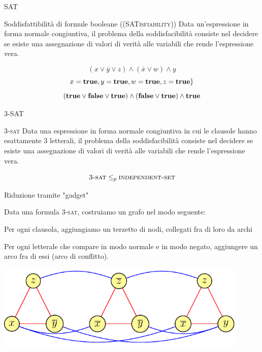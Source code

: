 \begin{frame}{SAT}

\vspace{-9pt}
\begin{block}{Soddisfattibilità di formule booleane ((\textsc{SATisfiability}))}
Data un'espressione in forma normale congiuntiva, il problema
della \alert{soddisfacibilità} consiste nel decidere se esiste una
assegnazione di valori di verità alle variabili che rende
l'espressione vera. 
\end{block}

\bigskip
{}
\[
  (x \vee \overline{y} \vee z) \wedge (\overline{x} \vee w) \wedge y
\]
\pause
\[
x = \TRUE, y = \TRUE, w = \TRUE, z = \TRUE \}
\]
\[
  (\TRUE \vee \FALSE \vee \TRUE) \wedge (\FALSE \vee \TRUE) \wedge \TRUE
\]

\end{frame}

\begin{frame}{3-SAT}

\vspace{-9pt}
\begin{block}{\textsc{3-sat}}
Data una espressione in forma normale congiuntiva in cui le
clausole \alert{hanno esattamente 3 letterali}, il problema della soddisfacibilità  consiste nel decidere se esiste una assegnazione di valori di verità alle variabili che rende l'espressione vera. 
\end{block}

\bigskip
{}
\[
  \textsc{3-sat} \leq_p \textsc{independent-set}
\]

\end{frame}




\begin{frame}{Riduzione tramite "gadget"}

Data una formula \textsc{3-sat}, costruiamo un grafo nel modo seguente:
\BIL
\item Per ogni clausola, aggiungiamo un terzetto di nodi, collegati fra di loro
da archi
\item Per ogni letterale che compare in modo normale e in modo negato, aggiungere un arco fra di essi (arco di conflitto).
\EIL

\bigskip
\begin{center}
\includegraphics[width=0.9\textwidth,page=1]{gadget.pdf}
\end{center}

\end{frame}

